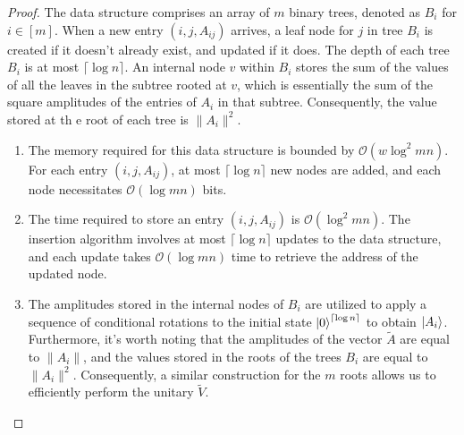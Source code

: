 \documentclass[10pt,twoside,reqno]{amsart} %
\theoremstyle{plain}
\theoremstyle{definition}
\begin{document}
\begin{proof}
  The data structure comprises an array of $m$ binary trees, denoted as $B_i$ 
  for $i \in [m]$. When a new entry $(i, j, A_{ij})$ arrives, a leaf node for
  $j$ in tree $B_i$ is created if it doesn't already exist, and updated if it
  does. The depth of each tree $B_i$ is at most $\lceil\log n\rceil$. An internal
  node $v$ within $B_i$ stores the sum of the values of all the leaves in the
  subtree rooted at $v$, which is essentially the sum of the square amplitudes
  of the entries of $A_i$ in that subtree. Consequently, the value stored at th
  e root of each tree is $\|A_i\|^2$. 
  \begin{enumerate}
    \item The memory required for this data structure is bounded by
      $\mathcal{O}(w\log^2 mn)$. For each entry $(i, j, A_{ij})$, at most
      $\lceil\log n\rceil$ new nodes are added, and each node necessitates
      $\mathcal{O}(\log mn)$ bits.
    \item The time required to store an entry $(i, j, A_{ij})$ is
      $\mathcal{O}(\log^2 mn)$. The insertion algorithm involves at most 
      $\lceil \log n\rceil$ updates to the data structure, and each update takes
      $\mathcal{O}(\log mn)$ time to retrieve the address of the updated node.
    \item The amplitudes stored in the internal nodes of $B_i$ are utilized
      to apply a sequence of conditional rotations to the initial state
      $\ket0^{\lceil\log n\rceil}$ to obtain $\ket{A_i}$. Furthermore, it's
      worth noting that the amplitudes of the vector $\widetilde{A}$ are equal
      to $\|A_i\|$, and the values stored in the roots of the trees $B_i$ are
      equal to $\|A_i\|^2$. Consequently, a similar construction for the $m$
      roots allows us to efficiently perform the unitary $\widetilde{V}$.
  \end{enumerate}
\end{proof}
\end{document}
